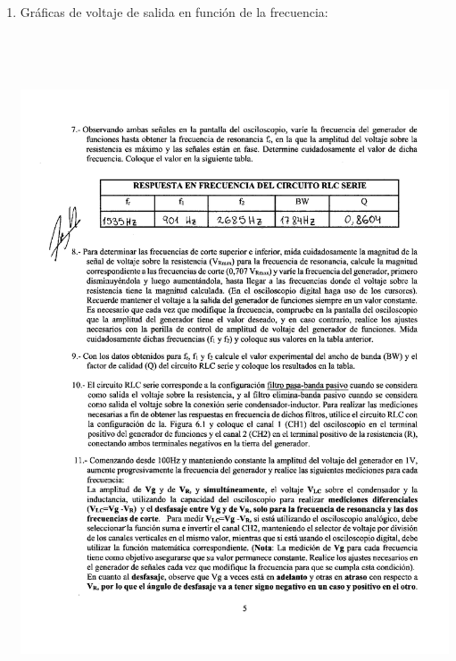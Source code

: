 \documentclass[12pt]{article}
\begin{document}
\begin{enumerate}
    	\item Gráficas de voltaje de salida en función de la frecuencia:
    	
    	\begin{center}
    		\includegraphics[width=16cm,height=20cm]{Img/prac_0002}
    	\end{center}
    	

\end{enumerate}
\end{document}
